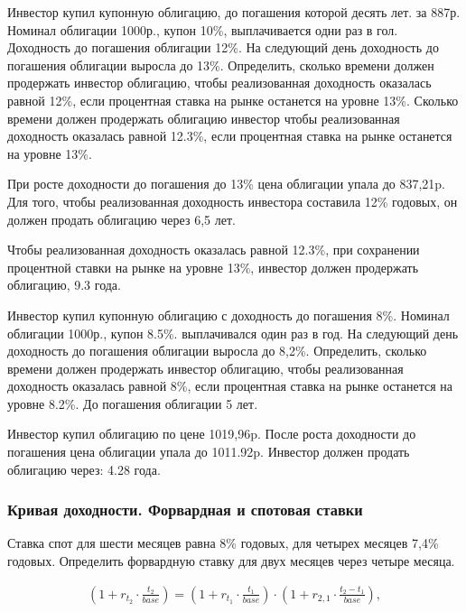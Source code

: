 \documentclass[12pt, table, a4paper,twoside]{exam}
\begin{document}
\begin{questions}
\question[10] Инвестор купил купонную облигацию, до погашения которой десять лет. за 887р. Номинал облигации 1000р., купон 10\%, выплачивается одни раз в гол. Доходность до погашения облигации 12\%. На следующий день доходность до погашения облигации выросла до 13\%. Определить, сколько времени должен продержать инвестор облигацию, чтобы реализованная доходность оказалась равной 12\%, если процентная ставка на рынке останется на уровне 13\%. Сколько времени должен продержать облигацию инвестор чтобы реализованная доходность оказалась равной 12.3\%, если процентная ставка на рынке останется на уровне 13\%.

\begin{solution}[12em]
	
	\raggedright
	При росте доходности до погашения до 13\% цена облигации упала до 837,21p. Для того, чтобы реализованная доходность инвестора составила 12\% годовых, он должен продать облигацию через 6,5 лет.
	
	Чтобы реализованная доходность оказалась равной 12.3\%, при сохранении процентной ставки на рынке на уровне 13\%, инвестор должен продержать облигацию, 9.3 года.
\end{solution}

\question[10] Инвестор купил купонную облигацию с доходность до погашения 8\%. Номинал облигации 1000р., купон 8.5\%. выплачивался один раз в год. На следующий день доходность до погашения облигации выросла до 8,2\%. Определить, сколько времени должен продержать инвестор облигацию, чтобы реализованная доходность оказалась равной 8\%, если процентная ставка на рынке останется на уровне 8.2\%. До погашения облигации 5 лет.

\begin{solution}[12em]

	\raggedright
	Инвестор купил облигацию по цене 1019,96p. После роста доходности до погашения цена облигации упала до 1011.92p. Инвестор должен продать облигацию через: 4.28 года. 	
\end{solution}


\subsubsection{Кривая доходности. Форвардная и спотовая ставки}

\question[10] Ставка спот для шести месяцев равна 8\% годовых, для четырех месяцев 7,4\% годовых. Определить форвардную ставку для двух месяцев через четыре месяца.

\begin{solution}[12em]
	\begin{align}
	\left(1+ r_{t_2} \cdot \frac{t_2}{base} \right) = \left(1+ r_{t_1} \cdot \frac{t_1}{base} \right) \cdot \left(1+ r_{2,1} \cdot \frac{t_2 - t_1}{base} \right),
	\end{align}
	

\end{solution}
\end{questions}
\end{document}
